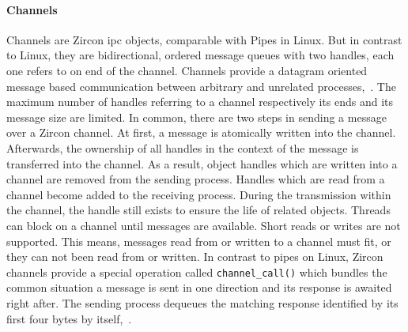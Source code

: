 %

\paragraph{Channels}
Channels are Zircon \ac{ipc} objects, comparable with Pipes in Linux.
But in contrast to Linux, they are bidirectional, ordered message queues with two handles, each one refers to on end of the channel.
Channels provide a datagram oriented message based communication between arbitrary and unrelated processes\cite{zircon-channel},~\cite{zircon-concepts}.
The maximum number of handles referring to a channel respectively its ends and its message size are limited.
In common, there are two steps in sending a message over a Zircon channel.
At first, a message is atomically written into the channel.
Afterwards, the ownership of all handles in the context of the message is transferred into the channel\cite{zircon-channel}.
As a result, object handles which are written into a channel are removed from the sending process.
Handles which are read from a channel become added to the receiving process.
During the transmission within the channel, the handle still exists to ensure the life of related objects\cite{zircon-concepts}.
Threads can block on a channel until messages are available.
Short reads or writes are not supported.
This means, messages read from or written to a channel must fit, or they can not been read from or written.
In contrast to pipes on Linux, Zircon channels provide a special operation called \texttt{channel\_call()} which bundles the common situation a message is sent in one direction and its response is awaited right after.
The sending process dequeues the matching response identified by its first four bytes by itself\cite{zircon-concepts},~\cite{zircon-channel}.

